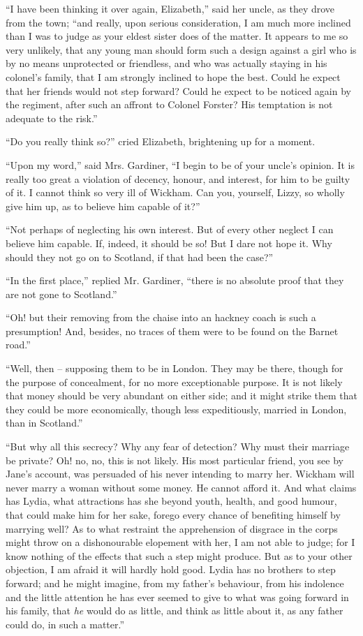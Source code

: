 
“I have been thinking it over again, Elizabeth,” said
her uncle, as they drove from the town; “and really,
upon serious consideration, I am much more inclined
than I was to judge as your eldest sister does of the matter.
It appears to me so very unlikely, that any young man
should form such a design against a girl who is by no
means unprotected or friendless, and who was actually
staying in his colonel’s family, that I am strongly inclined
to hope the best. Could he expect that her friends would
not step forward? Could he expect to be noticed again
by the regiment, after such an affront to Colonel Forster?
His temptation is not adequate to the risk.”

“Do you really think so?” cried Elizabeth, brightening
up for a moment.

“Upon my word,” said Mrs. Gardiner, “I begin to be
of your uncle’s opinion. It is really too great a violation
of decency, honour, and interest, for him to be guilty of
it. I cannot think so very ill of Wickham. Can you,
yourself, Lizzy, so wholly give him up, as to believe him
capable of it?”

“Not perhaps of neglecting his own interest. But of
every other neglect I can believe him capable. If, indeed,
it should be so! But I dare not hope it. Why should
they not go on to Scotland, if that had been the case?”

“In the first place,” replied Mr. Gardiner, “there is
no absolute proof that they are not gone to Scotland.”

“Oh! but their removing from the chaise into an
hackney coach is such a presumption! And, besides, no
traces of them were to be found on the Barnet road.”

“Well, then -- supposing them to be in London. They
may be there, though for the purpose of concealment,
for no more exceptionable purpose. It is not likely that
money should be very abundant on either side; and it
might strike them that they could be more economically,
though less expeditiously, married in London, than in
Scotland.”

“But why all this secrecy? Why any fear of detection?
Why must their marriage be private? Oh! no, no, this
is not likely. His most particular friend, you see by
Jane’s account, was persuaded of his never intending to
marry her. Wickham will never marry a woman without
some money. He cannot afford it. And what claims has
Lydia, what attractions has she beyond youth, health, and
good humour, that could make him for her sake, forego
every chance of benefiting himself by marrying well? As
to what restraint the apprehension of disgrace in the corps
might throw on a dishonourable elopement with her, I am
not able to judge; for I know nothing of the effects that
such a step might produce. But as to your other objection,
I am afraid it will hardly hold good. Lydia has no
brothers to step forward; and he might imagine, from
my father’s behaviour, from his indolence and the little
attention he has ever seemed to give to what was going
forward in his family, that \textit{he} would do as little, and
think as little about it, as any father could do, in such
a matter.”

